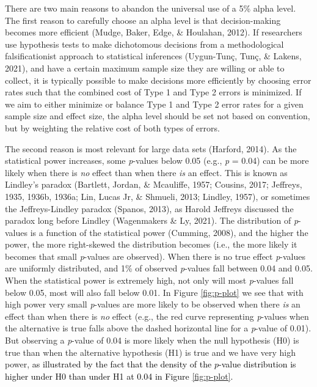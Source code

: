 \documentclass[
  english,
  ,man, a4paper,floatsintext]{apa6}
\begin{document}
There are two main reasons to abandon the universal use of a 5\% alpha level. The first reason to carefully choose an alpha level is that decision-making becomes more efficient (Mudge, Baker, Edge, \& Houlahan, 2012). If researchers use hypothesis tests to make dichotomous decisions from a methodological falsificationist approach to statistical inferences (Uygun-Tunç, Tunç, \& Lakens, 2021), and have a certain maximum sample size they are willing or able to collect, it is typically possible to make decisions more efficiently by choosing error rates such that the combined cost of Type 1 and Type 2 errors is minimized. If we aim to either minimize or balance Type 1 and Type 2 error rates for a given sample size and effect size, the alpha level should be set not based on convention, but by weighting the relative cost of both types of errors.

The second reason is most relevant for large data sets (Harford, 2014). As the statistical power increases, some \emph{p}-values below 0.05 (e.g., \emph{p} = 0.04) can be more likely when there is \emph{no} effect than when there \emph{is} an effect. This is known as Lindley's paradox (Bartlett, Jordan, \& Mcauliffe, 1957; Cousins, 2017; Jeffreys, 1935, 1936b, 1936a; Lin, Lucas Jr, \& Shmueli, 2013; Lindley, 1957), or sometimes the Jeffreys-Lindley paradox (Spanos, 2013), as Harold Jeffreys discussed the paradox long before Lindley (Wagenmakers \& Ly, 2021). The distribution of \emph{p}-values is a function of the statistical power (Cumming, 2008), and the higher the power, the more right-skewed the distribution becomes (i.e., the more likely it becomes that small \emph{p}-values are observed). When there is no true effect \emph{p}-values are uniformly distributed, and 1\% of observed \emph{p}-values fall between 0.04 and 0.05. When the statistical power is extremely high, not only will most \emph{p}-values fall below 0.05, most will also fall below 0.01. In Figure \ref{fig:p-plot} we see that with high power very small \emph{p}-values are more likely to be observed when there \emph{is} an effect than when there is \emph{no} effect (e.g., the red curve representing \emph{p}-values when the alternative is true falls above the dashed horizontal line for a \emph{p}-value of 0.01). But observing a \emph{p}-value of 0.04 is more likely when the null hypothesis (H0) is true than when the alternative hypothesis (H1) is true and we have very high power, \textcolor{black}{as illustrated by the fact that the density of the $p$-value distribution is higher under H0 than under H1 at 0.04 in Figure \ref{fig:p-plot}.}
\end{document}

